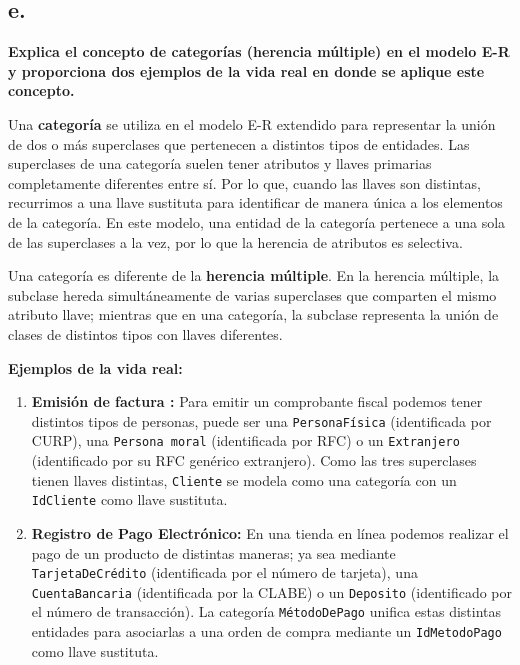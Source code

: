 \subsection*{e. }

    
\textbf{Explica el concepto de categorías (herencia múltiple) en el modelo E-R y proporciona dos ejemplos de la vida real en donde se aplique este concepto.}

Una \textbf{categoría} se utiliza en el modelo E-R extendido para representar la unión de dos o más superclases que pertenecen a distintos tipos de entidades. Las superclases de una categoría suelen tener atributos y llaves primarias completamente diferentes entre sí. Por lo que, cuando las llaves son distintas, recurrimos a una llave sustituta para identificar de manera única a los elementos de la categoría. En este modelo, una entidad de la categoría pertenece a una sola de las superclases a la vez, por lo que la herencia de atributos es selectiva.

Una categoría es diferente de la \textbf{herencia múltiple}. En la herencia múltiple, la subclase hereda simultáneamente de varias superclases que comparten el mismo atributo llave; mientras que en una categoría, la subclase representa la unión de clases de distintos tipos con llaves diferentes.

\textbf{Ejemplos de la vida real:}

\begin{enumerate}
    \item \textbf{Emisión de factura :} Para emitir un comprobante fiscal podemos tener distintos tipos de personas, puede ser una \texttt{PersonaFísica} (identificada por CURP), una \texttt{Persona moral} (identificada por RFC) o un \texttt{Extranjero} (identificado por su RFC genérico extranjero). Como las tres superclases tienen llaves distintas, \texttt{Cliente} se modela como una categoría con un \texttt{IdCliente} como llave sustituta.
    
    \item \textbf{Registro de Pago Electrónico:} En una tienda en línea podemos realizar el pago de un producto de distintas maneras; ya sea mediante \texttt{TarjetaDeCrédito} (identificada por el número de tarjeta), una \texttt{CuentaBancaria} (identificada por la CLABE) o un \texttt{Deposito} (identificado por el número de transacción). La categoría \texttt{MétodoDePago} unifica estas distintas entidades para asociarlas a una orden de compra mediante un \texttt{IdMetodoPago} como llave sustituta.
\end{enumerate}
